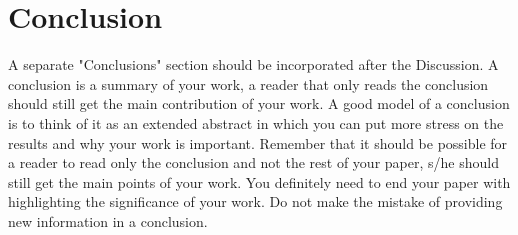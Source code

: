 \chapter{Conclusion}
 
A separate "Conclusions" section should be incorporated after the Discussion. A conclusion is a summary of your work, a reader that only reads the conclusion should still get the main contribution of your work. A good model of a conclusion is to think of it as an extended abstract in which you can put more stress on the results and why your work is important. Remember that it should be possible for a reader to read only the conclusion and not the rest of your paper, s/he should still get the main points of your work. You definitely need to end your paper with highlighting the significance of your work. Do not make the mistake of providing new information in a conclusion.